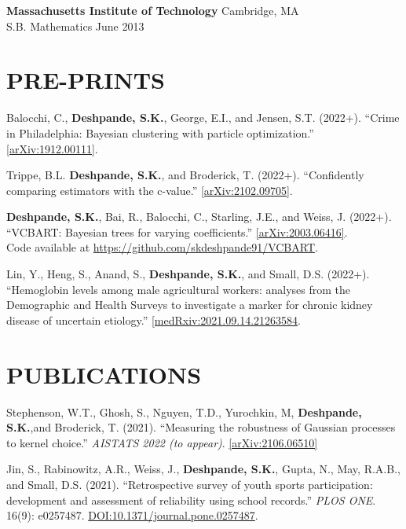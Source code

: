 \documentclass[margin]{res}
\begin{document}
\begin{resume}
                {\bf Massachusetts Institute of Technology} \hfill Cambridge, MA \\
                S.B. Mathematics \hfill June 2013 
  
  
\section{PRE-PRINTS}

Balocchi, C., \textbf{Deshpande, S.K.}, George, E.I., and Jensen, S.T. (2022+). ``Crime in Philadelphia: Bayesian clustering with particle optimization.'' \href{https://arxiv.org/abs/1912.00111}{[arXiv:1912.00111]}.

Trippe, B.L. \textbf{Deshpande, S.K.}, and Broderick, T. (2022+). ``Confidently comparing estimators with the c-value.'' \href{https://arxiv.org/abs/2102.09705}{[arXiv:2102.09705]}. 

\textbf{Deshpande, S.K.}, Bai, R., Balocchi, C., Starling, J.E., and Weiss, J. (2022+). ``VCBART: Bayesian trees for varying coefficients.'' \href{https://arxiv.org/abs/2003.06416}{[arXiv:2003.06416]}. \\ Code available at \url{https://github.com/skdeshpande91/VCBART}.

Lin, Y., Heng, S., Anand, S., \textbf{Deshpande, S.K.}, and Small, D.S. (2022+). ``Hemoglobin levels among male agricultural workers: analyses from the Demographic and Health Surveys to investigate a marker for chronic kidney disease of uncertain etiology.'' \href{https://www.medrxiv.org/content/10.1101/2021.09.14.21263584v2}{[medRxiv:2021.09.14.21263584}.

\section{PUBLICATIONS}

Stephenson, W.T., Ghosh, S., Nguyen, T.D., Yurochkin, M, \textbf{Deshpande, S.K.},and Broderick, T. (2021). ``Measuring the robustness of Gaussian processes to kernel choice.'' \textit{AISTATS 2022 (to appear)}. \href{https://arxiv.org/abs/2106.06510}{[arXiv:2106.06510]}

Jin, S., Rabinowitz, A.R., Weiss, J., \textbf{Deshpande, S.K.}, Gupta, N., May, R.A.B., and Small, D.S. (2021). ``Retrospective survey of youth sports participation: development and assessment of reliability using school records.'' \textit{PLOS ONE}. 16(9): e0257487. \href{https://doi.org/10.1371/journal.pone.0257487}{DOI:10.1371/journal.pone.0257487}.


\end{resume}
\end{document}
